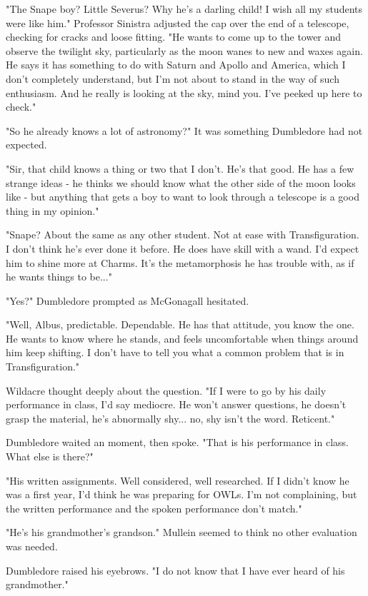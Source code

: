 \documentclass[a4paper,11pt]{article}
\begin{document}
"The Snape boy? Little Severus? Why he's a darling child! I wish all my students were like him." Professor Sinistra adjusted the cap over the end of a telescope, checking for cracks and loose fitting. "He wants to come up to the tower and observe the twilight sky, particularly as the moon wanes to new and waxes again. He says it has something to do with Saturn and Apollo and America, which I don't completely understand, but I'm not about to stand in the way of such enthusiasm. And he really is looking at the sky, mind you. I've peeked up here to check."

"So he already knows a lot of astronomy?" It was something Dumbledore had not expected.

"Sir, that child knows a thing or two that I don't. He's that good. He has a few strange ideas - he thinks we should know what the other side of the moon looks like - but anything that gets a boy to want to look through a telescope is a good thing in my opinion."

"Snape? About the same as any other student. Not at ease with Transfiguration. I don't think he's ever done it before. He does have skill with a wand. I'd expect him to shine more at Charms. It's the metamorphosis he has trouble with, as if he wants things to be..."

"Yes?" Dumbledore prompted as McGonagall hesitated.

"Well, Albus, predictable. Dependable. He has that attitude, you know the one. He wants to know where he stands, and feels uncomfortable when things around him keep shifting. I don't have to tell you what a common problem that is in Transfiguration."

Wildacre thought deeply about the question. "If I were to go by his daily performance in class, I'd say mediocre. He won't answer questions, he doesn't grasp the material, he's abnormally shy... no, shy isn't the word. Reticent."

Dumbledore waited an moment, then spoke. "That is his performance in class. What else is there?"

"His written assignments. Well considered, well researched. If I didn't know he was a first year, I'd think he was preparing for OWLs. I'm not complaining, but the written performance and the spoken performance don't match."

"He's his grandmother's grandson." Mullein seemed to think no other evaluation was needed.

Dumbledore raised his eyebrows. "I do not know that I have ever heard of his grandmother."
\end{document}
